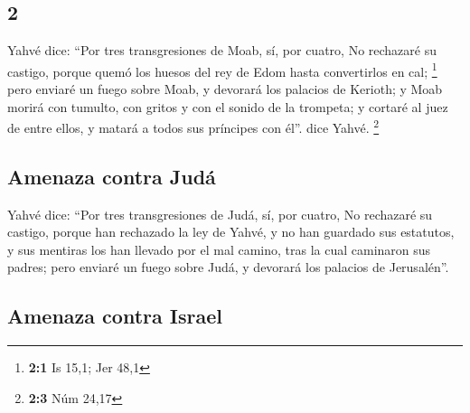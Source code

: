 \begin{paracol}{2}
\hypertarget{section-2}{%
\section{2}\label{section-2}}

 Yahvé dice: ``Por tres transgresiones de Moab, sí, por
cuatro, No rechazaré su castigo, porque quemó los huesos del rey de Edom
hasta convertirlos en cal; \footnote{\textbf{2:1} Is 15,1; Jer 48,1}
 pero enviaré un fuego sobre Moab, y devorará los palacios
de Kerioth; y Moab morirá con tumulto, con gritos y con el sonido de la
trompeta;  y cortaré al juez de entre ellos, y matará a
todos sus príncipes con él''. dice Yahvé. \footnote{\textbf{2:3} Núm
  24,17}

\hypertarget{amenaza-contra-juduxe1}{%
\subsection{Amenaza contra Judá}\label{amenaza-contra-juduxe1}}

 Yahvé dice: ``Por tres transgresiones de Judá, sí, por
cuatro, No rechazaré su castigo, porque han rechazado la ley de Yahvé, y
no han guardado sus estatutos, y sus mentiras los han llevado por el mal
camino, tras la cual caminaron sus padres;  pero enviaré
un fuego sobre Judá, y devorará los palacios de Jerusalén''.

\hypertarget{amenaza-contra-israel}{%
\subsection{Amenaza contra Israel}\label{amenaza-contra-israel}}


\end{paracol}
